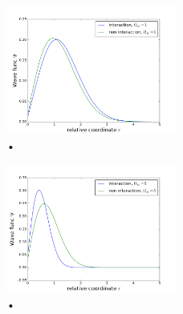 \documentclass[%
 reprint,
 nobalancelastpage,
 amsmath,amssymb,
 aps,
]{revtex4-1}
\begin{document}
 \begin{figure}[h]
\centering
\includegraphics[width=0.5\textwidth]{../omega1.png}
\caption{•}
\label{fig:my_label}
\end{figure}

 \begin{figure}[h]
\centering
\includegraphics[width=0.5\textwidth]{../omega5.png}
\caption{•}
\label{fig:my_label}
\end{figure}







\end{document}

